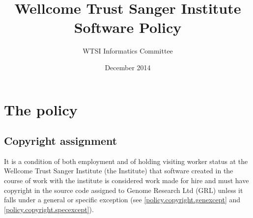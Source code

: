 \documentclass[10pt,a4paper]{article}
\begin{document}
\title{
Wellcome Trust Sanger Institute \\
Software Policy
}
\author{WTSI Informatics Committee}
\date{December 2014}

\maketitle

\newcommand{\exectitle}[0]{Chief Operating Officer}

\newcommand{\execperson}[0]{Martin Dougherty} 

\newcommand{\filename}[1]{\texttt{#1}} 

\newenvironment{boilerplate}{\bgroup\small\samepage }{\egroup} 

\setlength{\parindent}{0pt} %

\setlength{\parskip}{4mm plus2mm minus2mm}

\section{The policy}
\label{policy}

\subsection{Copyright assignment}
\label{policy.copyright}
\par It is a condition of both employment and of holding visiting worker status at the 
Wellcome Trust Sanger Institute (the Institute) that software created in the course 
of work with the institute is considered work made for hire and must have 
copyright in the source code assigned to Genome Research Ltd (GRL) unless it 
falls under a general or specific exception (see \ref{policy.copyright.genexcept} and 
\ref{policy.copyright.specexcept}). 
\end{document}
